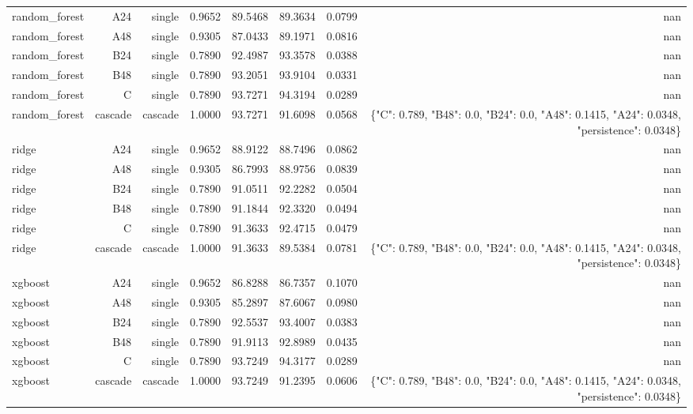 \begin{table}[htbp]
\begin{tabular}{lrrrrrrr}
random\_forest & A24 & single & 0.9652 & 89.5468 & 89.3634 & 0.0799 & nan \\
random\_forest & A48 & single & 0.9305 & 87.0433 & 89.1971 & 0.0816 & nan \\
random\_forest & B24 & single & 0.7890 & 92.4987 & 93.3578 & 0.0388 & nan \\
random\_forest & B48 & single & 0.7890 & 93.2051 & 93.9104 & 0.0331 & nan \\
random\_forest & C & single & 0.7890 & 93.7271 & 94.3194 & 0.0289 & nan \\
random\_forest & cascade & cascade & 1.0000 & 93.7271 & 91.6098 & 0.0568 & \{"C": 0.789, "B48": 0.0, "B24": 0.0, "A48": 0.1415, "A24": 0.0348, "persistence": 0.0348\} \\
ridge & A24 & single & 0.9652 & 88.9122 & 88.7496 & 0.0862 & nan \\
ridge & A48 & single & 0.9305 & 86.7993 & 88.9756 & 0.0839 & nan \\
ridge & B24 & single & 0.7890 & 91.0511 & 92.2282 & 0.0504 & nan \\
ridge & B48 & single & 0.7890 & 91.1844 & 92.3320 & 0.0494 & nan \\
ridge & C & single & 0.7890 & 91.3633 & 92.4715 & 0.0479 & nan \\
ridge & cascade & cascade & 1.0000 & 91.3633 & 89.5384 & 0.0781 & \{"C": 0.789, "B48": 0.0, "B24": 0.0, "A48": 0.1415, "A24": 0.0348, "persistence": 0.0348\} \\
xgboost & A24 & single & 0.9652 & 86.8288 & 86.7357 & 0.1070 & nan \\
xgboost & A48 & single & 0.9305 & 85.2897 & 87.6067 & 0.0980 & nan \\
xgboost & B24 & single & 0.7890 & 92.5537 & 93.4007 & 0.0383 & nan \\
xgboost & B48 & single & 0.7890 & 91.9113 & 92.8989 & 0.0435 & nan \\
xgboost & C & single & 0.7890 & 93.7249 & 94.3177 & 0.0289 & nan \\
xgboost & cascade & cascade & 1.0000 & 93.7249 & 91.2395 & 0.0606 & \{"C": 0.789, "B48": 0.0, "B24": 0.0, "A48": 0.1415, "A24": 0.0348, "persistence": 0.0348\} \\
\bottomrule
\end{tabular}
\end{table}
